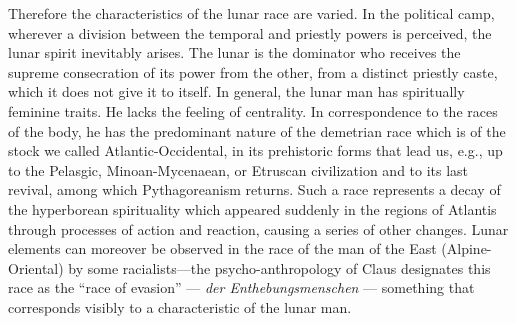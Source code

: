 Therefore the characteristics of the lunar race are varied. In the political camp, wherever a division between the temporal and priestly powers is perceived, the lunar spirit inevitably arises. The lunar is the dominator who receives the supreme consecration of its power from the other, from a distinct priestly caste, which it does not give it to itself. In general, the lunar man has spiritually feminine traits. He lacks the feeling of centrality. In correspondence to the races of the body, he has the predominant nature of the demetrian race which is of the stock we called Atlantic-Occidental, in its prehistoric forms that lead us, e.g., up to the Pelasgic, Minoan-Mycenaean, or Etruscan civilization and to its last revival, among which Pythagoreanism returns. Such a race represents a decay of the hyperborean spirituality which appeared suddenly in the regions of Atlantis through processes of action and reaction, causing a series of other changes. Lunar elements can moreover be observed in the race of the man of the East (Alpine-Oriental) by some racialists---the psycho-anthropology of Claus designates this race as the ``race of evasion'' --- \emph{der Enthebungsmenschen} --- something that corresponds visibly to a characteristic of the lunar man.



